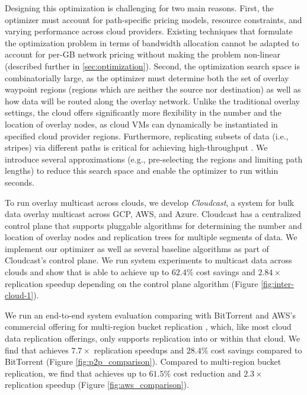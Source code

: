 Designing this optimization is challenging for two main reasons. 
First, the optimizer must account for path-specific pricing models, resource constraints, and varying performance across cloud providers. Existing techniques that formulate the optimization problem in terms of bandwidth allocation cannot be adapted to account for per-GB network pricing without making the problem non-linear (described further in \cref{sec:optimization}). 
Second, the optimization search space is combinatorially large, as the optimizer must determine both the set of overlay waypoint regions (regions which are neither the source nor destination) as well as how data will be routed along the overlay network. %
Unlike the traditional overlay settings, the cloud offers significantly more flexibility in the number and the location of overlay nodes, as cloud VMs can dynamically be instantiated in specified cloud provider regions. Furthermore, replicating subsets of data (i.e., stripes) via different paths is critical for achieving high-throughput \cite{castro2003splitstream}.
We introduce several approximations (e.g., pre-selecting the regions and limiting path lengths) to reduce this search space and enable the optimizer to run within seconds.

To run overlay multicast across clouds, we develop \textit{Cloudcast}, a system for bulk data overlay multicast across GCP, AWS, and Azure.
%
Cloudcast has a centralized control plane that supports pluggable algorithms for determining the number and location of overlay nodes and replication trees for multiple segments of data. 
%
We implement our optimizer as well as several baseline algorithms as part of Cloudcast's control plane. 
We run system experiments to multicast data across clouds and show that \sys is able to achieve up to $62.4\%$ cost savings and $2.84\times$ replication speedup depending on the control plane algorithm (Figure \ref{fig:inter-cloud-1}).  

We run an end-to-end system evaluation comparing \sys with  BitTorrent \cite{facebook-bittorrent} and AWS's commercial offering for multi-region bucket replication \cite{awsbucket}, which, like most cloud data replication offerings, only supports replication into or within that cloud.
% 
We find that \sys achieves $7.7\times$ replication speedups and $28.4\%$ cost savings compared to BitTorrent (Figure \ref{fig:p2p_comparison}). Compared to multi-region bucket replication, we find that \sys achieves up to $61.5\%$ cost reduction and $2.3\times$ replication speedup (Figure \ref{fig:aws_comparison}).

